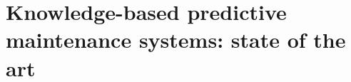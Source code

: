 \chapter{Knowledge-based predictive maintenance systems: state of the art}\label{ch5}
\normalsize
	\minitoc
	
	\clearpage